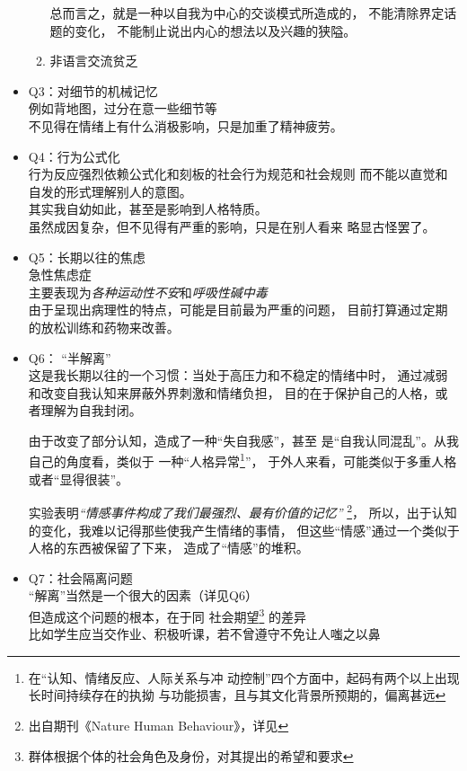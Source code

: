\documentclass{assignment}
\begin{document}
\begin{problem}
\begin{itemize}
\begin{enumerate}
                总而言之，就是一种以自我为中心的交谈模式所造成的，
                不能清除界定话题的变化，
                不能制止说出内心的想法以及兴趣的狭隘。

        \item 非语言交流贫乏
    \end{enumerate}
    \item Q3：对细节的机械记忆\\
            例如背地图，过分在意一些细节等\\
            不见得在情绪上有什么消极影响，只是加重了精神疲劳。
    \item Q4：行为公式化\\
            行为反应强烈依赖公式化和刻板的社会行为规范和社会规则
            而不能以直觉和自发的形式理解别人的意图。\\
            其实我自幼如此，甚至是影响到人格特质。\\
            虽然成因复杂，但不见得有严重的影响，只是在别人看来
            略显古怪罢了。
    \item Q5：长期以往的焦虑\\
            急性焦虑症\\
            主要表现为\emph{各种运动性不安}和\emph{呼吸性碱中毒}\\
            由于呈现出病理性的特点，可能是目前最为严重的问题，
            目前打算通过定期的放松训练和药物来改善。

    \item Q6： “半解离”\\
            这是我长期以往的一个习惯：当处于高压力和不稳定的情绪中时，
            通过减弱和改变自我认知来屏蔽外界刺激和情绪负担，
            目的在于保护自己的人格，或者理解为自我封闭。


            由于改变了部分认知，造成了一种“失自我感”，甚至
            是“自我认同混乱”。从我自己的角度看，类似于
            一种“人格异常\footnote[1]{在“认知、情绪反应、人际关系与冲
            动控制”四个方面中，起码有两个以上出现长时间持续存在的执拗
            与功能损害，且与其文化背景所预期的，偏离甚远}”，
            于外人来看，可能类似于多重人格或者“显得很装”。


            实验表明\emph{“情感事件构成了我们最强烈、最有价值的记忆”}
            \footnote[2]{出自期刊《Nature Human Behaviour》，详见\cite{1}}，
            所以，出于认知的变化，我难以记得那些使我产生情绪的事情，
            但这些“情感”通过一个类似于人格的东西被保留了下来，
            造成了“情感”的堆积。
    \item Q7：社会隔离问题\\
            “解离”当然是一个很大的因素（详见Q6）\\
            但造成这个问题的根本，在于同
            社会期望\footnote[1]{群体根据个体的社会角色及身份，对其提出的希望和要求}
            的差异\\
            比如学生应当交作业、积极听课，若不曾遵守不免让人嗤之以鼻



\end{itemize}
\end{problem}
\end{document}
